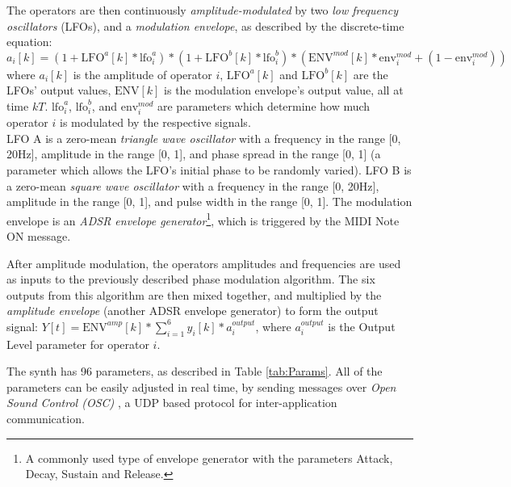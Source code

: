 \documentclass[11pt, oneside]{report}   	%
\begin{document}
The operators are then continuously \emph{amplitude-modulated} by two \emph{low frequency oscillators} (LFOs), and a \emph{modulation envelope}, as described by the discrete-time equation:
 \begin{equation}
a_i[k] = (1 + \mathrm{LFO}^a[k]*\mathrm{lfo}^{a}_i)*(1 + \mathrm{LFO}^b[k]*\mathrm{lfo}^{b}_i)*(\mathrm{ENV}^{mod}[k]*\mathrm{env}^{mod}_i + (1-\mathrm{env}^{mod}_i))
\end{equation}
where  $a_i[k]$ is the amplitude of operator $i$, $\mathrm{LFO}^a[k]$ and $\mathrm{LFO}^b[k]$ are the LFOs' output values, $\mathrm{ENV}[k]$ is the modulation envelope's output value, all at time $kT$. $\mathrm{lfo}^{a}_i$, $\mathrm{lfo}^{b}_i$, and $\mathrm{env}^{mod}_{i}$ are parameters which determine how much operator $i$ is modulated by the respective signals. \\
LFO A is a zero-mean \emph{triangle wave oscillator} with a frequency in the range [0, 20\si{\hertz}], amplitude in the range [0, 1], and phase spread in the range [0, 1] (a parameter which allows the LFO's initial phase to be randomly varied). LFO B is a zero-mean \emph{square wave oscillator} with a frequency in the range [0, 20\si{\hertz}], amplitude in the range [0, 1], and pulse width in the range [0, 1]. The modulation envelope is an \emph{ADSR  envelope generator}\footnote{A commonly used type of envelope generator with the parameters Attack, Decay, Sustain and Release.}, which is triggered by the MIDI Note ON message.


After amplitude modulation, the operators amplitudes and frequencies are used as inputs to the previously described phase modulation algorithm. The six outputs from this algorithm are then mixed together, and multiplied by the \emph{amplitude envelope} (another ADSR envelope generator) to form the output signal: $Y[t] = \mathrm{ENV}^{amp}[k]*\sum_{i=1}^{6}y_i[k]*a_i^{output}$, where $a_i^{output}$ is the Output Level parameter for operator $i$.

The synth has 96 parameters, as described in Table \ref{tab:Params}. All of the parameters can be easily adjusted in real time, by sending messages over \emph{Open Sound Control (OSC)} \cite{OSC}, a UDP based protocol for inter-application communication.
\end{document}
